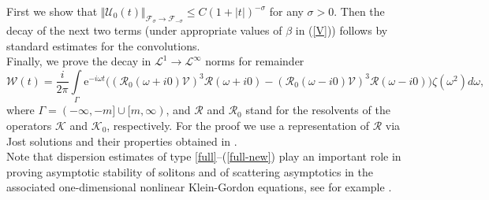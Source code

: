 \documentclass[reqno]{amsart}
\newcommand{\cL}{{\mathcal L}}
\newcommand{\cF}{{\mathcal F}}
\newcommand{\cR}{{\mathcal R}}
\newcommand{\cK}{{\mathcal K}}
\newcommand{\cV}{{\mathcal V}}
\newcommand{\cU}{{\mathcal U}}
\newcommand{\E}{\mathrm{e}}
\numberwithin{equation}{section}
\begin{document}
First we show that  $\Vert \cU_0(t)\Vert_{\cF_{\sigma}\to \cF_{-\sigma}}\le C(1+|t|)^{-\sigma}$ for any $\sigma>0$.
Then the  decay of the next two terms (under  appropriate values of $\beta$ in (\ref{V}))
follows by  standard estimates for the convolutions.
\smallskip\\
Finally, we prove the decay in $\cL^1\to \cL^\infty$ norms for remainder
\begin{equation*}
{\mathcal W}(t)=\frac {i}{2\pi}\int\limits_{\Gamma} \!\E^{-i\omega t}
\big((\cR_0(\omega+\!i0) \cV)^3 \cR(\omega+\!i0)\!-\!(\cR _0(\omega-\! i0)\cV)^3 \cR(\omega-\! i0)\big)\zeta(\omega^2)d\omega, 
\end{equation*}
where $\Gamma=(-\infty,-m]\cup [m,\infty)$,   and $\cR$  and
$\cR_0$ stand for the  resolvents  of the operators $\cK$ and $\cK_0$, respectively.
For the proof we use  a representation of $\cR$ via Jost solutions  and their properties 
obtained in  \cite{EKTM}.
\smallskip\\
Note that dispersion estimates of type \eqref{full}--(\ref{full-new}) play an important role in proving asymptotic
stability of solitons and of scattering asymptotics in the associated one-dimensional nonlinear Klein-Gordon equations,
see for example \cite{KK11}.

\setcounter{equation}{0}
\end{document}
